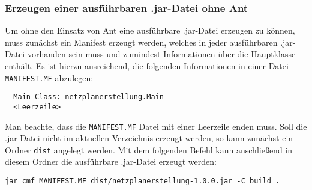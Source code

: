 \subsubsection{Erzeugen einer ausf\"uhrbaren .jar-Datei ohne Ant}

Um ohne den Einsatz von Ant eine ausf\"uhrbare .jar-Datei erzeugen zu
k\"onnen, muss zun\"achst ein Manifest erzeugt werden, welches in
jeder ausf\"uhrbaren .jar-Datei vorhanden sein muss und zumindest
Informationen \"uber die Hauptklasse enth\"alt. Es ist hierzu
ausreichend, die folgenden Informationen in einer Datei
\texttt{MANIFEST.MF} abzulegen:
\lstset{
  numbers=left
}
\begin{lstlisting}
  Main-Class: netzplanerstellung.Main
  <Leerzeile>
\end{lstlisting}
Man beachte, dass die \texttt{MANIFEST.MF} Datei mit einer Leerzeile
enden muss.
Soll die .jar-Datei nicht im aktuellen Verzeichnis erzeugt werden, so
kann zun\"achst ein Ordner \texttt{dist} angelegt werden. Mit dem
folgenden Befehl kann anschlie{\ss}end in diesem Ordner die
ausf\"uhrbare .jar-Datei erzeugt werden:
\begin{verbatim}
jar cmf MANIFEST.MF dist/netzplanerstellung-1.0.0.jar -C build .
\end{verbatim}

